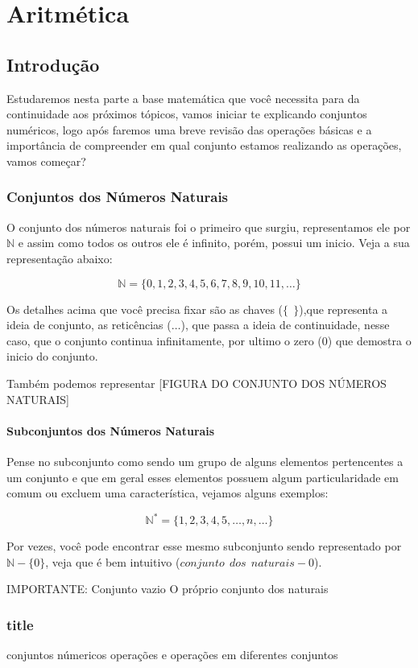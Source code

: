 \chapter{Aritmética}
\section{Introdução}
Estudaremos nesta parte a base matemática que você necessita para da continuidade aos próximos tópicos, vamos iniciar te explicando conjuntos numéricos, logo após faremos uma breve revisão das operações básicas e a importância de compreender em qual conjunto estamos realizando as operações, vamos começar?
\subsection{Conjuntos dos Números Naturais}
O conjunto dos números naturais foi o primeiro que surgiu, representamos ele por $\mathbb{N}$ e assim como todos os outros ele é infinito, porém, possui um inicio. Veja a sua representação abaixo:

$$ \mathbb{N}= \{0,1,2,3,4,5,6,7,8,9,10,11, \ldots \}$$

Os detalhes acima que você precisa fixar são as chaves ($\{~~ \}$),que representa a ideia de conjunto, as reticências ($\ldots$), que passa a ideia de continuidade, nesse caso, que o conjunto continua infinitamente, por ultimo o zero ($0$) que demostra o inicio do conjunto.

Também podemos representar 
[FIGURA DO CONJUNTO DOS NÚMEROS NATURAIS]

\subsubsection{Subconjuntos dos Números Naturais}
Pense no subconjunto como sendo um grupo de alguns elementos pertencentes a um conjunto e que em geral esses elementos possuem algum particularidade em comum ou excluem uma característica, vejamos alguns exemplos:

\begin{example}
	$$\mathbb{N}^{*}=\{1,2,3,4,5,\ldots,n,\ldots\}$$
	
	Por vezes, você pode encontrar esse mesmo subconjunto sendo representado por $\mathbb{N}-\{ 0 \}$, veja que é bem intuitivo ($conjunto~~dos~~naturais - 0$).
\end{example}


IMPORTANTE:
Conjunto vazio
O próprio conjunto dos naturais

\subsection{title}


conjuntos númericos
operações e 
operações em diferentes conjuntos

